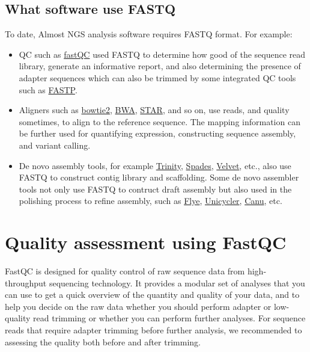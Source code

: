 \documentclass[
  letterpaper,
  DIV=11,
  numbers=noendperiod]{scrreprt}
\begin{document}
\hypertarget{what-software-use-fastq}{%
\subsection{What software use FASTQ}\label{what-software-use-fastq}}

To date, Almost NGS analysis software requires FASTQ format. For
example:

\begin{itemize}
\item
  QC such as
  \href{https://www.bioinformatics.babraham.ac.uk/projects/fastqc/}{fastQC}
  used FASTQ to determine how good of the sequence read library,
  generate an informative report, and also determining the presence of
  adapter sequences which can also be trimmed by some integrated QC
  tools such as \href{https://github.com/OpenGene/fastp}{FASTP}.
\item
  Aligners such as
  \href{https://github.com/BenLangmead/bowtie2}{bowtie2},
  \href{https://github.com/lh3/bwa}{BWA},
  \href{https://github.com/alexdobin/STAR}{STAR}, and so on, use reads,
  and quality sometimes, to align to the reference sequence. The mapping
  information can be further used for quantifying expression,
  constructing sequence assembly, and variant calling.
\item
  De novo assembly tools, for example
  \href{https://github.com/trinityrnaseq/trinityrnaseq}{Trinity},
  \href{https://github.com/ablab/spades}{Spades},
  \href{https://github.com/dzerbino/velvet}{Velvet}, etc., also use
  FASTQ to construct contig library and scaffolding. Some de novo
  assembler tools not only use FASTQ to contruct draft assembly but also
  used in the polishing process to refine assembly, such as
  \href{https://github.com/fenderglass/Flye}{Flye},
  \href{https://github.com/rrwick/Unicycler}{Unicycler},
  \href{https://github.com/marbl/canu}{Canu}, etc.
\end{itemize}

\hypertarget{quality-assessment-using-fastqc}{%
\section{Quality assessment using
FastQC}\label{quality-assessment-using-fastqc}}

FastQC is designed for quality control of raw sequence data from
high-throughput sequencing technology. It provides a modular set of
analyses that you can use to get a quick overview of the quantity and
quality of your data, and to help you decide on the raw data whether you
should perform adapter or low-quality read trimming or whether you can
perform further analyses. For sequence reads that require adapter
trimming before further analysis, we recommended to assessing the
quality both before and after trimming.
\end{document}
